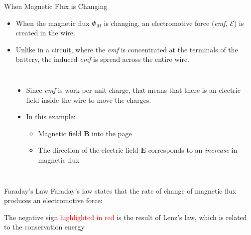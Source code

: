 \documentclass[12pt,aspectratio=169]{beamer}
\newcommand{\mb}[1]{\mathbf{#1}}
\newcommand{\eq}[2]{\vspace{#1}{\Large\begin{displaymath}#2\end{displaymath}}}
\begin{document}
\begin{frame}{When Magnetic Flux is Changing}
  \begin{itemize}
  \item When the magnetic flux $\Phi_M$ is changing, an electromotive force
    (\emph{emf}, $\mathcal{E}$) is created in the wire.
  \item Unlike in a circuit, where the \emph{emf} is concentrated at the
    terminals of the battery, the induced \emph{emf} is spread across the
    entire wire.
  \end{itemize}
  \begin{columns}
    \begin{center}
    \end{center}
    
    \begin{itemize}
    \item Since \emph{emf} is work per unit charge, that means that there is an
      electric field inside the wire to move the charges.
    \item In this example:
      \begin{itemize}
      \item Magnetic field $\mb{B}$ into the page
      \item The direction of the electric field $\mb{E}$ corresponds to an
        \emph{increase} in magnetic flux
      \end{itemize}
    \end{itemize}
  \end{columns}
\end{frame}


\begin{frame}{Faraday's Law}
  Faraday's law states that the rate of change of magnetic flux produces an
  electromotive force:

  \eq{-.2in}{
    \boxed{
      \mathcal{E}=\oint\mb{E}\cdot d\mb{l}={\color{red}{-}}\frac{d\Phi}{dt}
    }
  }
  
  The negative sign {\textcolor{red}{highlighted in red}} is the result of
  Lenz's law, which is related to the conservation energy
\end{frame}
\end{document}
